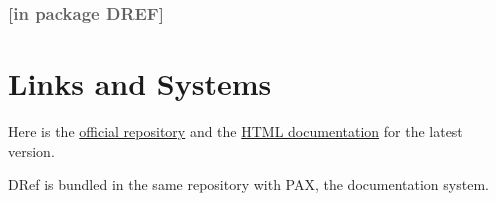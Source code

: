 \label{x-28DREF-3A-40DREF-MANUAL-20MGL-PAX-3ASECTION-29}

\subsubsection*{\normalfont\textcolor[HTML]{606060}{[in package DREF]}}

\section{Links and Systems}\label{links-and-systems}

\label{x-28DREF-3A-40LINKS-AND-SYSTEMS-20MGL-PAX-3ASECTION-29}

Here is the \href{https://github.com/melisgl/mgl-pax/dref}{official
repository} and the
\href{http://melisgl.github.io/mgl-pax-world/dref-manual.html}{HTML
documentation} for the latest version.

DRef is bundled in the same repository with PAX, the documentation
system.

